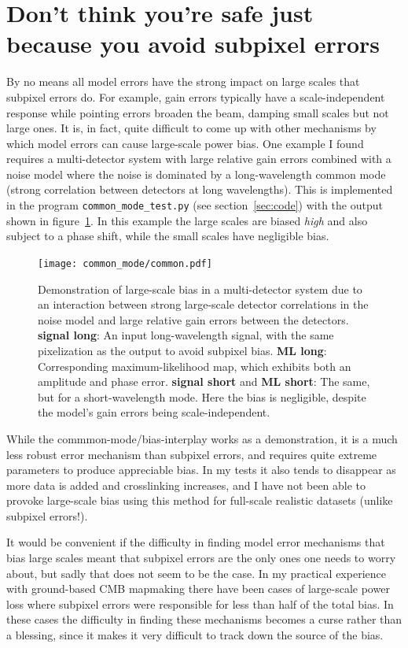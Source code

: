 \documentclass[twocolumn,apj]{aastex63}
\newcommand{\dfn}[1]{\textbf{#1}}
\begin{document}
\section{Don't think you're safe just because you avoid subpixel errors}
By no means all model errors have the strong impact on large scales
that subpixel errors do. For example, gain errors typically have a
scale-independent response while pointing errors broaden the beam, damping
small scales but not large ones. It is, in fact, quite difficult to come up
with other mechanisms by which model errors can cause large-scale power
bias. One example I found requires a multi-detector system with large relative
gain errors combined with a noise model where the noise is
dominated by a long-wavelength common mode (strong correlation between detectors
at long wavelengths). This is implemented in the program \verb|common_mode_test.py|
(see section~\ref{sec:code})
with the output shown in figure~\ref{fig:common}. In this example the
large scales are biased \emph{high} and also subject to a phase shift, while
the small scales have negligible bias.

\begin{figure}
	\centering
	\texttt{[image: common\_mode/common.pdf]}
	\caption{
		Demonstration of large-scale bias in a multi-detector system
		due to an interaction between strong large-scale
		detector correlations in the noise model and large
		relative gain errors between the detectors.
		\dfn{signal long}: An input long-wavelength signal,
		with the same pixelization as the output to avoid subpixel bias.
		\dfn{ML long}: Corresponding maximum-likelihood map, which
		exhibits both an amplitude and phase error.
		\dfn{signal short} and \dfn{ML short}: The same, but for a
		short-wavelength mode. Here the bias is negligible,
		despite the model's gain errors being scale-independent.
	}
	\label{fig:common}
\end{figure}

While the commmon-mode/bias-interplay works as a demonstration, it is a much
less robust error mechanism than subpixel errors, and requires quite extreme
parameters to produce appreciable bias. In my tests it also tends to disappear
as more data is added and crosslinking increases, and I have not been able to
provoke large-scale bias using this method for full-scale realistic datasets
(unlike subpixel errors!).

It would be convenient if the difficulty in finding model error mechanisms that
bias large scales meant that subpixel errors are the only ones one needs to
worry about, but sadly that does not seem to be the case. In my practical
experience with ground-based CMB mapmaking there have been cases of large-scale
power loss where subpixel errors were responsible for less than half of the
total bias. In these cases the difficulty in finding these mechanisms becomes
a curse rather than a blessing, since it makes it very difficult to track down
the source of the bias.
\end{document}
